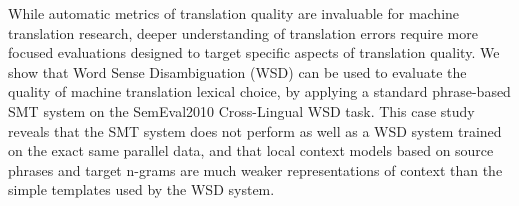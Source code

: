 While automatic metrics of translation quality are invaluable for machine translation research, deeper understanding of translation errors require more
 focused evaluations designed to target specific aspects of translation quality.
 We show that Word Sense Disambiguation (WSD)  can be used to evaluate the
 quality of machine translation lexical choice, by applying a standard
 phrase-based SMT system on the SemEval2010 Cross-Lingual WSD task. This case
 study reveals that the SMT system does not perform as well as a WSD system
 trained on the exact same parallel data, and that local context models based on
 source phrases and target n-grams are much weaker representations of context
 than the simple templates used by the WSD system.

